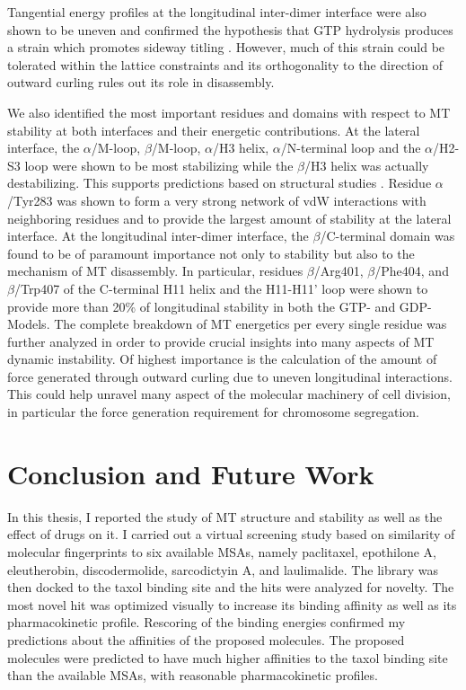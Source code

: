 \documentclass[11pt]{report}
\begin{document}
Tangential energy profiles at the
longitudinal inter-dimer interface were also shown to be uneven and
confirmed the hypothesis that GTP
hydrolysis produces a strain which promotes sideway titling 
\cite{Alushin2014,Mitchison2014}.
However, much of this strain could 
be tolerated within the lattice constraints and its orthogonality
to the direction of outward
curling rules out its role in
disassembly.

We also identified the most important residues and domains with respect to MT stability at both 
interfaces and their energetic contributions. At the lateral
interface, the $\alpha$/M-loop, $\beta$/M-loop, $\alpha$/H3 helix, $\alpha$/N-terminal loop and the
$\alpha$/H2-S3 loop were shown 
to be most stabilizing while the
$\beta$/H3 helix was actually 
destabilizing. This
supports predictions based on structural 
studies \cite{Nogales1999,Li2002}.
Residue $\alpha$/Tyr283
was shown to form a very strong
network of vdW interactions with neighboring residues and to
provide the largest amount
of stability at the lateral interface.
At the longitudinal inter-dimer interface,
the $\beta$/C-terminal domain was found to be 
of paramount importance not only 
to stability but also to the
mechanism of MT disassembly.
In particular, residues 
$\beta$/Arg401, $\beta$/Phe404, and
$\beta$/Trp407 of the C-terminal
H11 helix and the
H11-H11' loop were shown to provide
more than 20\% of longitudinal
stability in both the GTP- and GDP-Models.
The complete breakdown
of MT energetics per every single
residue was further analyzed in order to
provide crucial insights into many aspects
of MT dynamic instability.
Of highest importance is the 
calculation of the amount
of force generated through outward
curling due to uneven longitudinal
interactions. This could
help unravel many aspect of the
molecular machinery of cell
division, in particular the force generation requirement for chromosome segregation.

\chapter{Conclusion and Future Work}

In this thesis, I reported the study of MT structure and stability as
well as the effect of drugs on it. I carried out a virtual screening study based
on similarity of molecular fingerprints to six available MSAs, namely 
paclitaxel, epothilone A, eleutherobin, discodermolide, sarcodictyin A, and
laulimalide. The library was then docked to the taxol binding site and the hits
were analyzed for novelty. The most novel hit was optimized visually to 
increase its binding affinity as well as its pharmacokinetic profile.
Rescoring of the binding energies confirmed my predictions about the affinities
of the proposed molecules. The proposed molecules were predicted to have much higher affinities to the taxol binding site than the available MSAs, with
reasonable pharmacokinetic profiles.
\end{document}
